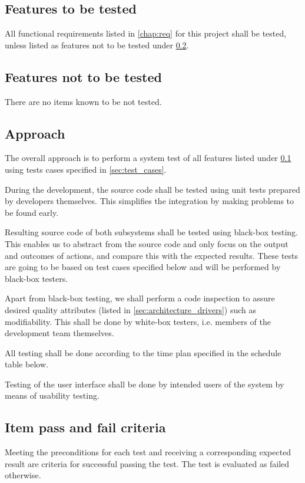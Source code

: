 \documentclass[11pt]{book}
\begin{document}
\subsection{Features to be tested} \label{sec:test_plan_features_tested}
All functional requirements listed in \ref{chap:req} for this project shall be tested, unless listed as features not to be tested under \ref{sec:test_plan_features_not_tested}.

\subsection{Features not to be tested} \label{sec:test_plan_features_not_tested}
There are no items known to be not tested.

\subsection{Approach}
The overall approach is to perform a system test of all features listed under \ref{sec:test_plan_features_tested} using tests cases specified in \ref{sec:test_cases}.

During the development, the source code shall be tested using unit tests prepared by developers themselves. This simplifies the integration by making problems to be found early.

Resulting source code of both subsystems shall be tested using black-box testing. This enables us to abstract from the source code and only focus on the output and outcomes of actions, and compare this with the expected results. These tests are going to be based on test cases specified below and will be performed by black-box testers.

Apart from black-box testing, we shall perform a code inspection to assure desired quality attributes (listed in \ref{sec:architecture_drivers}) such as modifiability. This shall be done by white-box testers, i.e. members of the development team themselves.

All testing shall be done according to the time plan specified in the schedule table below.

Testing of the user interface shall be done by intended users of the system by means of usability testing. %

\subsection{Item pass and fail criteria}
Meeting the preconditions for each test and receiving a corresponding expected result are criteria for successful passing the test. The test is evaluated as failed otherwise.
\end{document}
